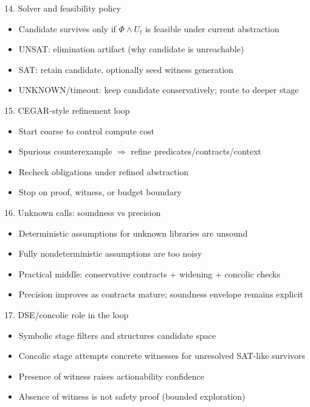 \documentclass[aspectratio=169]{beamer}
\begin{document}
\begin{frame}{14. Solver and feasibility policy}
\begin{itemize}
  \item Candidate survives only if \(\Phi \wedge U_t\) is feasible under current abstraction
  \item UNSAT: elimination artifact (why candidate is unreachable)
  \item SAT: retain candidate, optionally seed witness generation
  \item UNKNOWN/timeout: keep candidate conservatively; route to deeper stage
\end{itemize}
\end{frame}

\begin{frame}{15. CEGAR-style refinement loop}
\begin{itemize}
  \item Start coarse to control compute cost
  \item Spurious counterexample \(\Rightarrow\) refine predicates/contracts/context
  \item Recheck obligations under refined abstraction
  \item Stop on proof, witness, or budget boundary
\end{itemize}
\end{frame}

\begin{frame}{16. Unknown calls: soundness vs precision}
\begin{itemize}
  \item Deterministic assumptions for unknown libraries are unsound
  \item Fully nondeterministic assumptions are too noisy
  \item Practical middle: conservative contracts + widening + concolic checks
  \item Precision improves as contracts mature; soundness envelope remains explicit
\end{itemize}
\end{frame}

\begin{frame}{17. DSE/concolic role in the loop}
\begin{itemize}
  \item Symbolic stage filters and structures candidate space
  \item Concolic stage attempts concrete witnesses for unresolved SAT-like survivors
  \item Presence of witness raises actionability confidence
  \item Absence of witness is not safety proof (bounded exploration)
\end{itemize}
\end{frame}
\end{document}
